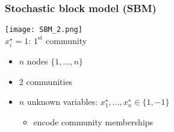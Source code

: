 \documentclass[compress,
mathserif,wide,%
]{beamer}
\begin{document}
\begin{frame}
	\frametitle{Stochastic block model (SBM)}


\vspace{-1em}

\begin{center}
	\texttt{[image: SBM\_2.png]}  \\
	  {\small $x_i^{\star}=1$: $1^{\text{st}}$ community}   
\end{center}

\begin{itemize}
	\itemsep0.5em
	\item  $n$ nodes $\{1,\ldots,n\}$
	\item  2 communities
	\item  $n$ unknown variables:  $x_1^{\star}, \ldots, x_n^{\star} \in \{1,-1\}$ 
	\begin{itemize}
		\item encode community memberships
	\end{itemize}

	
\end{itemize}



\end{frame}
\end{document}
